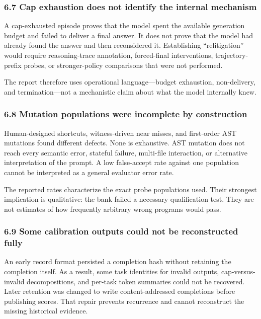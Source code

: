 \documentclass[
  9pt,
  letterpaper,
]{article}
\begin{document}
\hypertarget{67-cap-exhaustion-does-not-identify-the-internal-mechanism}{%
\subsubsection{6.7 Cap exhaustion does not identify the internal
mechanism}\label{67-cap-exhaustion-does-not-identify-the-internal-mechanism}}

A cap-exhausted episode proves that the model spent the available
generation budget and failed to deliver a final answer. It does not
prove that the model had already found the answer and then reconsidered
it. Establishing ``relitigation'' would require reasoning-trace
annotation, forced-final interventions, trajectory-prefix probes, or
stronger-policy comparisons that were not performed.

The report therefore uses operational language---budget exhaustion,
non-delivery, and termination---not a mechanistic claim about what the
model internally knew.

\hypertarget{68-mutation-populations-were-incomplete-by-construction}{%
\subsubsection{6.8 Mutation populations were incomplete by
construction}\label{68-mutation-populations-were-incomplete-by-construction}}

Human-designed shortcuts, witness-driven near misses, and first-order
AST mutations found different defects. None is exhaustive. AST mutation
does not reach every semantic error, stateful failure, multi-file
interaction, or alternative interpretation of the prompt. A low
false-accept rate against one population cannot be interpreted as a
general evaluator error rate.

The reported rates characterize the exact probe populations used. Their
strongest implication is qualitative: the bank failed a necessary
qualification test. They are not estimates of how frequently arbitrary
wrong programs would pass.

\hypertarget{69-some-calibration-outputs-could-not-be-reconstructed-fully}{%
\subsubsection{6.9 Some calibration outputs could not be reconstructed
fully}\label{69-some-calibration-outputs-could-not-be-reconstructed-fully}}

An early record format persisted a completion hash without retaining the
completion itself. As a result, some task identities for invalid
outputs, cap-versus-invalid decompositions, and per-task token summaries
could not be recovered. Later retention was changed to write
content-addressed completions before publishing scores. That repair
prevents recurrence and cannot reconstruct the missing historical
evidence.
\end{document}
